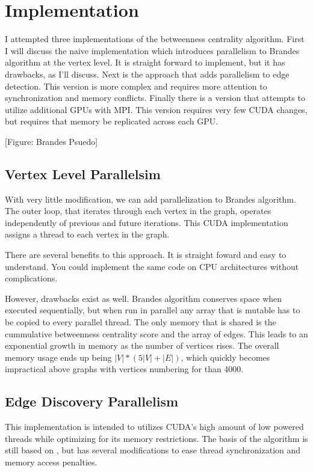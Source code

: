 \documentclass[10pt,twocolumn]{article}
\begin{document}
\section{Implementation}
I attempted three implementations of the betweenness centrality algorithm. First I will discuss the naive implementation which introduces parallelism to Brandes algorithm at the vertex level. It is straight forward to implement, but it has drawbacks, as I'll discuss. Next is the approach that adds parallelism to edge detection. This version is more complex and requires more attention to synchronization and memory conflicts. Finally there is a version that attempts to utilize additional GPUs with MPI. This version requires very few CUDA changes, but requires that memory be replicated across each GPU.
 
[Figure: Brandes Psuedo]
 
\subsection{Vertex Level Parallelsim}
With very little modification, we can add parallelization to Brandes algorithm. The outer loop, that iterates through each vertex in the graph, operates independently of previous and future iterations. This CUDA implementation assigns a thread to each vertex in the graph.
 
There are several benefits to this approach. It is straight foward and easy to understand. You could implement the same code on CPU architectures without complications.
 
However, drawbacks exist as well. Brandes algorithm conserves space when executed sequentially, but when run in parallel any array that is mutable has to be copied to every parallel thread. The only memory that is shared is the cummulative betweenness centrality score and the array of edges. This leads to an exponential growth in memory as the number of vertices rises. The overall memory usage ends up being $|V| * (5|V| + |E|)$, which quickly becomes impractical above graphs with vertices numbering for than 4000.
 
\subsection{Edge Discovery Parallelism}
\label{implBFS}
This implementation is intended to utilizes CUDA's high amount of low powered threads while optimizing for its memory restrictions. The basis of the algorithm is still based on \cite{Brandes01afaster}, but has several modifications to ease thread synchronization and memory access penalties.
 
\end{document}
